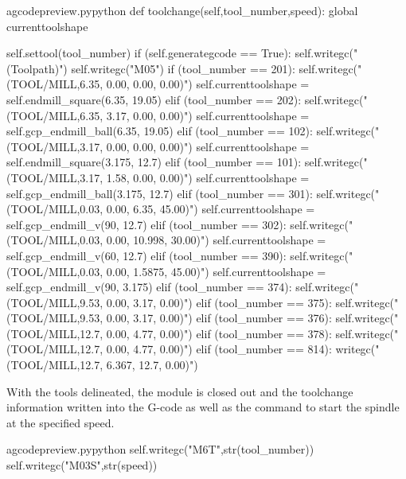 \documentclass{ltxdoc}
\begin{document}
\lstset{firstnumber=\thegcpy}
\begin{writecode}{a}{gcodepreview.py}{python}
    def toolchange(self,tool_number,speed):
        global currenttoolshape
        
        self.settool(tool_number)
        if (self.generategcode == True):
            self.writegc("(Toolpath)")
            self.writegc("M05")
        if (tool_number == 201):
            self.writegc("(TOOL/MILL,6.35, 0.00, 0.00, 0.00)")
            self.currenttoolshape = self.endmill_square(6.35, 19.05)
        elif (tool_number == 202):
            self.writegc("(TOOL/MILL,6.35, 3.17, 0.00, 0.00)")
            self.currenttoolshape = self.gcp_endmill_ball(6.35, 19.05)
        elif (tool_number == 102):
            self.writegc("(TOOL/MILL,3.17, 0.00, 0.00, 0.00)")
            self.currenttoolshape = self.endmill_square(3.175, 12.7)
        elif (tool_number == 101):
            self.writegc("(TOOL/MILL,3.17, 1.58, 0.00, 0.00)")
            self.currenttoolshape = self.gcp_endmill_ball(3.175, 12.7)
        elif (tool_number == 301):
            self.writegc("(TOOL/MILL,0.03, 0.00, 6.35, 45.00)")
            self.currenttoolshape = self.gcp_endmill_v(90, 12.7)
        elif (tool_number == 302):
            self.writegc("(TOOL/MILL,0.03, 0.00, 10.998, 30.00)")
            self.currenttoolshape = self.gcp_endmill_v(60, 12.7)
        elif (tool_number == 390):
            self.writegc("(TOOL/MILL,0.03, 0.00, 1.5875, 45.00)")
            self.currenttoolshape = self.gcp_endmill_v(90, 3.175)
        elif (tool_number == 374):
            self.writegc("(TOOL/MILL,9.53, 0.00, 3.17, 0.00)")
        elif (tool_number == 375):
            self.writegc("(TOOL/MILL,9.53, 0.00, 3.17, 0.00)")
        elif (tool_number == 376):
            self.writegc("(TOOL/MILL,12.7, 0.00, 4.77, 0.00)")
        elif (tool_number == 378):
            self.writegc("(TOOL/MILL,12.7, 0.00, 4.77, 0.00)")
        elif (tool_number == 814):
            writegc("(TOOL/MILL,12.7, 6.367, 12.7, 0.00)")
\end{writecode}
\addtocounter{gcpy}{38}
 
With the tools delineated, the module is closed out and the toolchange information written into the G-code as well as the command to start the spindle at the specified speed.
 
\lstset{firstnumber=\thegcpy}
\begin{writecode}{a}{gcodepreview.py}{python}
        self.writegc("M6T",str(tool_number))
        self.writegc("M03S",str(speed))

\end{writecode}
\addtocounter{gcpy}{3}
\end{document}
